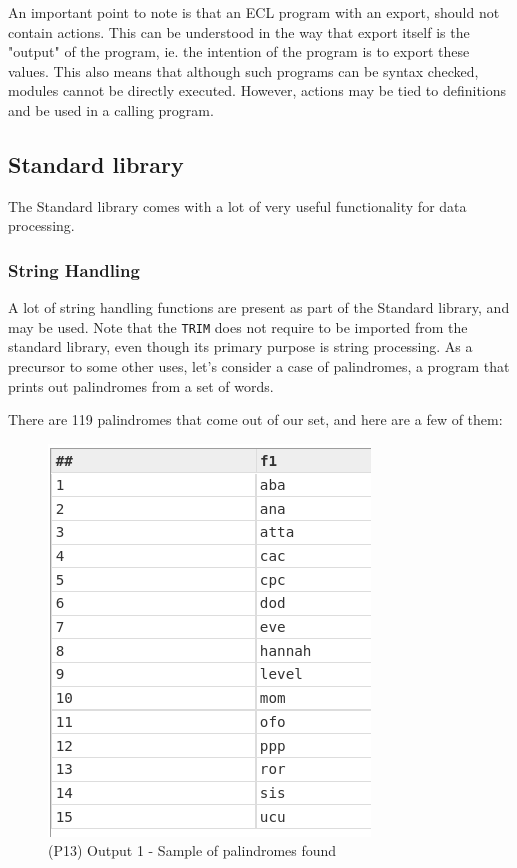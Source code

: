 An important point to note is that an ECL program with an export, should not contain actions. This can be understood in the way that export itself is the "output" of the program, ie. the intention of the program is to export these values. This also means that although such programs can be syntax checked, modules cannot be directly executed. However, actions may be tied to definitions and be used in a calling program.


\subsection{Standard library}

The Standard library comes with a lot of very useful functionality for data processing.

\subsubsection[String Handling]{String Handling}

A lot of string handling functions are present as part of the Standard library, and may be used. Note that the \lstinline{TRIM} does not require to be imported from the standard library, even though its primary purpose is string processing.
As a precursor to some other uses, let's consider a case of palindromes, a program that prints out palindromes from a set of words.




There are 119 palindromes that come out of our set, and here are a few of them:

\begin{figure}[h]
    \centering
    \includegraphics[width=.5\linewidth]{../output/76/1}
    \caption{(P13) Output 1 - Sample of palindromes found}
\end{figure}


